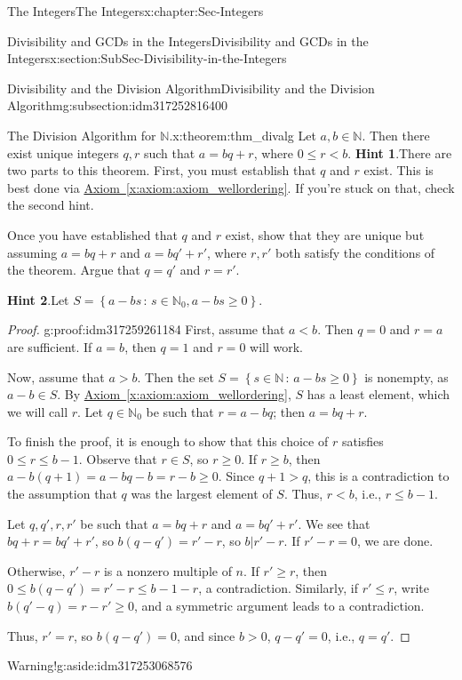 \documentclass[oneside,10pt,]{book}
\newcommand{\blocktitlefont}{\relax}
\newcommand{\xreffont}{\relax}
\numberwithin{equation}{section}
\renewcommand{\le}{\leqslant}
\renewcommand{\ge}{\geqslant}
\newcommand{\setof}[2]{{\left\{#1\,\colon\,#2\right\}}}
\def\N{{\mathbb N}}
\newcommand{\lt}{<}
\begin{document}
\begin{chapterptx}{The Integers}{}{The Integers}{}{}{x:chapter:Sec-Integers}
\begin{sectionptx}{Divisibility and GCDs in the Integers}{}{Divisibility and GCDs in the Integers}{}{}{x:section:SubSec-Divisibility-in-the-Integers}
\begin{subsectionptx}{Divisibility and the Division Algorithm}{}{Divisibility and the Division Algorithm}{}{}{g:subsection:idm317252816400}
\begin{theorem}{The Division Algorithm for \(\N\).}{}{x:theorem:thm_divalg}
\index{Division Algorithm (\(\N\))}%
Let \(a,b\in \N\). Then there exist unique integers \(q,r\) such that \(a = bq + r\), where \(0 \le r \lt b\).%
\textbf{\blocktitlefont Hint 1}.\quad{}There are two parts to this theorem. First, you must establish that \(q\) and \(r\) exist. This is best done via \hyperref[x:axiom:axiom_wellordering]{Axiom~{\xreffont\ref{x:axiom:axiom_wellordering}}}. If you're stuck on that, check the second hint.%
\par
Once you have established that \(q\) and \(r\) exist, show that they are unique but assuming \(a = bq+r\) and \(a = bq' + r'\), where \(r,r'\) both satisfy the conditions of the theorem. Argue that \(q = q'\) and \(r = r'\).%
\par\smallskip%
\noindent\textbf{\blocktitlefont Hint 2}.\quad{}Let \(S = \setof{a-bs}{s\in \N_0, a-bs\ge 0}\).%
\end{theorem}
\begin{proof}{}{g:proof:idm317259261184}
First, assume that \(a \lt b\). Then \(q = 0\) and \(r = a\) are sufficient. If \(a = b\), then \(q = 1\) and \(r = 0\) will work.%
\par
Now, assume that \(a > b\). Then the set \(S = \setof{s\in\N}{a-bs \ge 0}\) is nonempty, as \(a-b\in S\). By \hyperref[x:axiom:axiom_wellordering]{Axiom~{\xreffont\ref{x:axiom:axiom_wellordering}}}, \(S\) has a least element, which we will call \(r\). Let \(q\in \N_0\) be such that \(r = a-bq\); then \(a = bq + r\).%
\par
To finish the proof, it is enough to show that this choice of \(r\) satisfies \(0\le r \le b-1\). Observe that \(r\in S\), so \(r\ge 0\). If \(r \ge b\), then \(a - b(q+1) = a-bq -b = r -b \ge 0\). Since \(q+1 > q\), this is a contradiction to the assumption that \(q\) was the largest element of \(S\). Thus, \(r \lt b\), i.e., \(r \le b-1\).%
\par
Let \(q,q',r,r'\) be such that \(a = bq+r\) and \(a=bq'+r'\). We see that \(bq+r = bq' + r'\), so \(b(q-q') = r'-r\), so \(b|r'-r\). If \(r'-r = 0\), we are done.%
\par
Otherwise, \(r'-r\) is a nonzero multiple of \(n\). If \(r' \ge r\), then \(0\le b(q-q') = r' - r \le b-1 - r\), a contradiction. Similarly, if \(r' \le r\), write \(b(q'-q) = r-r' \ge 0\), and a symmetric argument leads to a contradiction.%
\par
Thus, \(r' = r\), so \(b(q-q') = 0\), and since \(b > 0\), \(q - q'= 0\), i.e., \(q = q'\).%
\end{proof}
\begin{aside}{Warning!}{g:aside:idm317253068576}%

\end{aside}
\end{subsectionptx}
\end{sectionptx}
\end{chapterptx}
\end{document}

